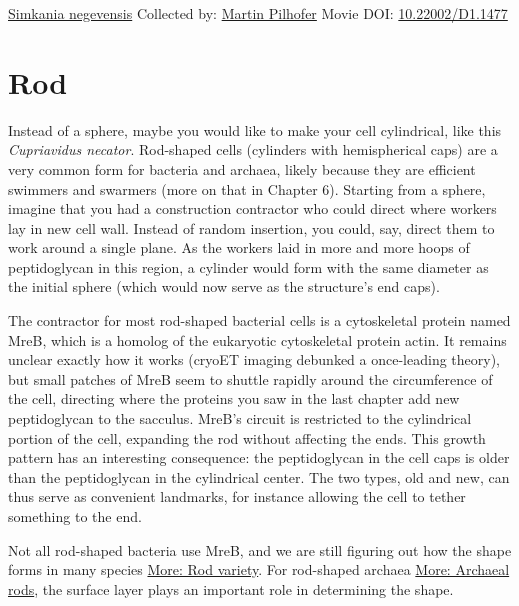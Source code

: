 \documentclass[]{tufte-book}
\begin{document}
\hypertarget{htmlwidget-3bd87cc11e527d694b1d}{}

\label{fig:3-1}\protect\hyperlink{tree}{Simkania negevensis} Collected by: \protect\hyperlink{martin_pilhofer}{Martin Pilhofer} Movie DOI: \href{https://doi.org/10.22002/D1.1477}{10.22002/D1.1477}

\hypertarget{rod}{%
\section{Rod}\label{rod}}

Instead of a sphere, maybe you would like to make your cell cylindrical, like this \emph{Cupriavidus necator}. Rod-shaped cells (cylinders with hemispherical caps) are a very common form for bacteria and archaea, likely because they are efficient swimmers and swarmers (more on that in Chapter 6). Starting from a sphere, imagine that you had a construction contractor who could direct where workers lay in new cell wall. Instead of random insertion, you could, say, direct them to work around a single plane. As the workers laid in more and more hoops of peptidoglycan in this region, a cylinder would form with the same diameter as the initial sphere (which would now serve as the structure's end caps).

The contractor for most rod-shaped bacterial cells is a cytoskeletal protein named MreB, which is a homolog of the eukaryotic cytoskeletal protein actin. It remains unclear exactly how it works (cryoET imaging debunked a once-leading theory), but small patches of MreB seem to shuttle rapidly around the circumference of the cell, directing where the proteins you saw in the last chapter add new peptidoglycan to the sacculus. MreB's circuit is restricted to the cylindrical portion of the cell, expanding the rod without affecting the ends. This growth pattern has an interesting consequence: the peptidoglycan in the cell caps is older than the peptidoglycan in the cylindrical center. The two types, old and new, can thus serve as convenient landmarks, for instance allowing the cell to tether something to the end.

Not all rod-shaped bacteria use MreB, and we are still figuring out how the shape forms in many species \protect\hyperlink{Rod_variety}{More: Rod variety}. For rod-shaped archaea \protect\hyperlink{Archaeal_rods}{More: Archaeal rods}, the surface layer plays an important role in determining the shape.



\hypertarget{htmlwidget-166dc05f7e65e58e87f5}{}
\end{document}
